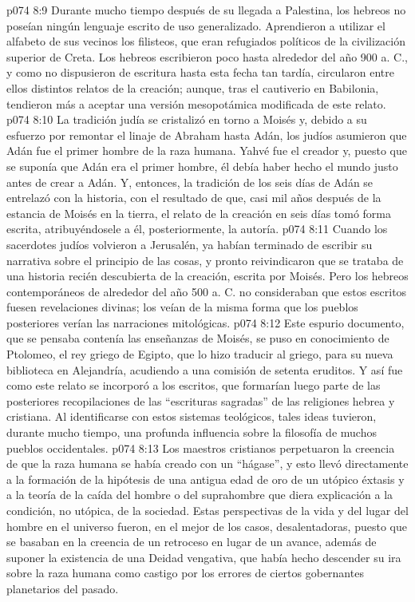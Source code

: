 \vs p074 8:9 Durante mucho tiempo después de su llegada a Palestina, los hebreos no poseían ningún lenguaje escrito de uso generalizado. Aprendieron a utilizar el alfabeto de sus vecinos los filisteos, que eran refugiados políticos de la civilización superior de Creta. Los hebreos escribieron poco hasta alrededor del año 900 a. C., y como no dispusieron de escritura hasta esta fecha tan tardía, circularon entre ellos distintos relatos de la creación; aunque, tras el cautiverio en Babilonia, tendieron más a aceptar una versión mesopotámica modificada de este relato.
\vs p074 8:10 La tradición judía se cristalizó en torno a Moisés y, debido a su esfuerzo por remontar el linaje de Abraham hasta Adán, los judíos asumieron que Adán fue el primer hombre de la raza humana. Yahvé fue el creador y, puesto que se suponía que Adán era el primer hombre, él debía haber hecho el mundo justo antes de crear a Adán. Y, entonces, la tradición de los seis días de Adán se entrelazó con la historia, con el resultado de que, casi mil años después de la estancia de Moisés en la tierra, el relato de la creación en seis días tomó forma escrita, atribuyéndosele a él, posteriormente, la autoría.
\vs p074 8:11 Cuando los sacerdotes judíos volvieron a Jerusalén, ya habían terminado de escribir su narrativa sobre el principio de las cosas, y pronto reivindicaron que se trataba de una historia recién descubierta de la creación, escrita por Moisés. Pero los hebreos contemporáneos de alrededor del año 500 a. C. no consideraban que estos escritos fuesen revelaciones divinas; los veían de la misma forma que los pueblos posteriores verían las narraciones mitológicas.
\vs p074 8:12 Este espurio documento, que se pensaba contenía las enseñanzas de Moisés, se puso en conocimiento de Ptolomeo, el rey griego de Egipto, que lo hizo traducir al griego, para su nueva biblioteca en Alejandría, acudiendo a una comisión de setenta eruditos. Y así fue como este relato se incorporó a los escritos, que formarían luego parte de las posteriores recopilaciones de las “escrituras sagradas” de las religiones hebrea y cristiana. Al identificarse con estos sistemas teológicos, tales ideas tuvieron, durante mucho tiempo, una profunda influencia sobre la filosofía de muchos pueblos occidentales.
\vs p074 8:13 Los maestros cristianos perpetuaron la creencia de que la raza humana se había creado con un “hágase”, y esto llevó directamente a la formación de la hipótesis de una antigua edad de oro de un utópico éxtasis y a la teoría de la caída del hombre o del suprahombre que diera explicación a la condición, no utópica, de la sociedad. Estas perspectivas de la vida y del lugar del hombre en el universo fueron, en el mejor de los casos, desalentadoras, puesto que se basaban en la creencia de un retroceso en lugar de un avance, además de suponer la existencia de una Deidad vengativa, que había hecho descender su ira sobre la raza humana como castigo por los errores de ciertos gobernantes planetarios del pasado.
